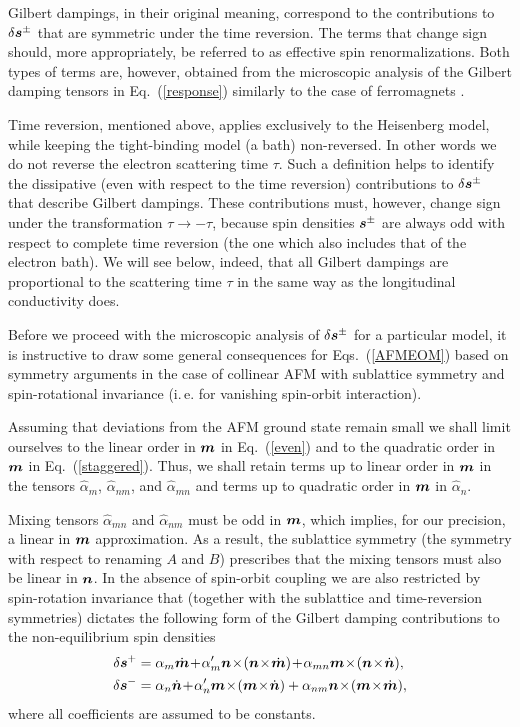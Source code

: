 Gilbert dampings, in their original meaning, correspond to the contributions to $\delta\boldsymbol{s}^{\pm}$ that are symmetric under the time reversion. 
The terms that change sign should, more appropriately, be referred to as effective spin renormalizations. Both types of terms are, however, obtained from the microscopic analysis of the Gilbert damping tensors in Eq.~(\ref{response}) similarly to the case of ferromagnets \cite{AdoSTTGD2019}.

Time reversion, mentioned above, applies exclusively to the Heisenberg model, while keeping the tight-binding model (a bath) non-reversed. In other words we do not reverse the electron scattering time $\tau$. Such a definition helps to identify the dissipative (even with respect to the time reversion) contributions to $\delta\boldsymbol{s}^{\pm}$ that describe Gilbert dampings. These contributions must, however, change sign under the transformation $\tau \to -\tau$, because spin densities $\boldsymbol{s}^\pm$ are always odd with respect to complete time reversion (the one which also includes that of the electron bath). We will see below, indeed, that all Gilbert dampings are proportional to the scattering time $\tau$ in the same way as the longitudinal conductivity does.  

Before we proceed with the microscopic analysis of $\delta\boldsymbol{s}^{\pm}$ for a particular model, it is instructive to draw some general consequences for Eqs.~(\ref{AFMEOM}) based on symmetry arguments in the case of collinear AFM with sublattice symmetry and spin-rotational invariance (i.\,e. for vanishing spin-orbit interaction).  

Assuming that deviations from the AFM ground state remain small we shall limit ourselves to the linear order in $\boldsymbol{m}$ in Eq.~(\ref{even}) and to the quadratic order in $\boldsymbol{m}$ in Eq.~(\ref{staggered}).  Thus, we shall retain terms up to linear order in $\boldsymbol{m}$ in the tensors $\hat{\alpha}_{m}$, $\hat{\alpha}_{nm}$, and $\hat{\alpha}_{mn}$ and terms up to quadratic order in $\boldsymbol{m}$ in $\hat{\alpha}_n$. 

Mixing tensors $\hat{\alpha}_{mn}$ and $\hat{\alpha}_{nm}$ must be odd in $\boldsymbol{m}$, which implies, for our precision, a linear in $\boldsymbol{m}$ approximation. As a result, the sublattice symmetry (the symmetry with respect to renaming $A$ and $B$) prescribes that the mixing tensors must also be linear in $\boldsymbol{n}$. In the absence of spin-orbit coupling we are also restricted by spin-rotation invariance that (together with the sublattice and time-reversion symmetries) dictates the following form of the Gilbert damping contributions to the non-equilibrium spin densities
\beml
\label{gen}
\begin{align}
\label{even}
\delta \bb{s}^{+} & = \alpha_m \dot{\bb{m}}  \!+\! \alpha'_m \bb{n}  \!\times\! (\bb{n} \!\times\! \dot{\bb{m}}) \!+\!\alpha_{mn}\bb{m}  \!\times\!  (\bb{n}  \!\times\!  \dot{\bb{n}}),\\
\delta \bb{s}^{-} &= \alpha_n \dot{\bb{n}} \!+\! \alpha'_n \bb{m}  \!\times\! (\bb{m} \!\times\! \dot{\bb{n}}) + \alpha_{nm} \bb{n}\!\times\!(\bb{m}\!\times\! \dot{\bb{m}}),
\label{staggered}
\end{align}
\eml
where all coefficients are assumed to be constants.  


